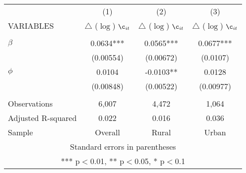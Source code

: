 \documentclass[]{article}
\begin{document}
\begin{tabular}{lccc} \hline
 & (1) & (2) & (3) \\
VARIABLES & $\triangle$ ($\log$) $\c_{it}$ & $\triangle$ ($\log$) $\c_{it}$ & $\triangle$ ($\log$) $\c_{it}$ \\ \hline
 &  &  &  \\
$\beta$ & 0.0634*** & 0.0565*** & 0.0677*** \\
 & (0.00554) & (0.00672) & (0.0107) \\
$\phi$ & 0.0104 & -0.0103** & 0.0128 \\
 & (0.00848) & (0.00522) & (0.00977) \\
 &  &  &  \\
Observations & 6,007 & 4,472 & 1,064 \\
Adjusted R-squared & 0.022 & 0.016 & 0.036 \\
 Sample & Overall & Rural & Urban \\ \hline
\multicolumn{4}{c}{ Standard errors in parentheses} \\
\multicolumn{4}{c}{ *** p$<$0.01, ** p$<$0.05, * p$<$0.1} \\
\end{tabular}
\end{document}
